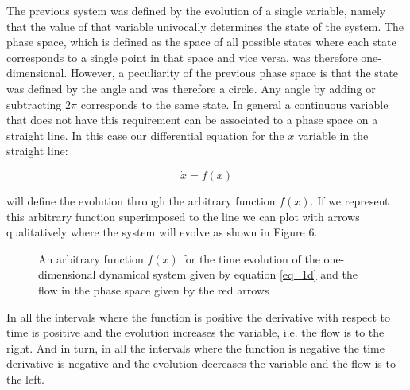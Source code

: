 \documentclass{article}
\begin{document}
The previous system was defined by the evolution of a single variable, namely that the value of that variable univocally determines the state of the system.
The phase space, which is defined as the space of all possible states where each state corresponds to a single point in that space and vice versa, was therefore one-dimensional. 
However, a peculiarity of the previous phase space is that the state was defined by the angle and was therefore a circle. 
Any angle by adding or subtracting $2\pi$ corresponds to the same state. 
In general a continuous variable that does not have this requirement can be associated to a phase space on a straight line.
In this case our differential equation for the $x$ variable in the straight line:

\begin{equation}
    \dot x = f(x)
    \label{eq_1d}
\end{equation}

will define the evolution through the arbitrary function $f(x)$. 
If we represent this arbitrary function superimposed to the line we can plot with arrows qualitatively where the system will evolve as shown in Figure 6.

\begin{figure}[h]
    \centering
    \caption{An arbitrary function $f(x)$ for the time evolution of the one-dimensional dynamical system given by equation \ref{eq_1d} and the flow in the phase space given by the red arrows} 
    \label{fig_onedimension}
\end{figure}

In all the intervals where the function is positive the derivative with respect to time is positive and the evolution increases the variable, i.e. the flow is to the right. 
And in turn, in all the intervals where the function is negative the time derivative is negative and the evolution decreases the variable and the flow is to the left.
\end{document}
